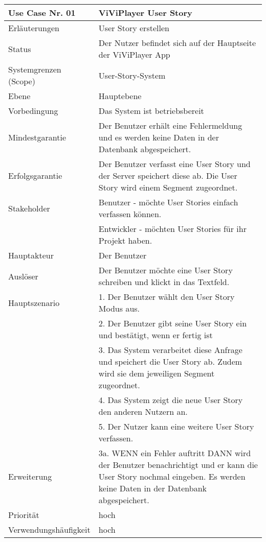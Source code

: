 \begin{tabularx}{\linewidth}{|l|X|}
	\hline
	Use Case Nr. 01			& \textbf{ViViPlayer User Story} \\ \hline
	Erläuterungen			&  User Story erstellen \\ \hline
	Status					&  Der Nutzer befindet sich auf der Hauptseite der ViViPlayer App \\ \hline
	Systemgrenzen (Scope)	&  User-Story-System\\ \hline
	Ebene					&  Hauptebene\\ \hline
	Vorbedingung			&  Das System ist betriebsbereit\\ \hline
	Mindestgarantie			&  Der Benutzer erhält eine Fehlermeldung und es werden keine Daten in der Datenbank abgespeichert.\\ \hline
	Erfolgsgarantie			&  Der Benutzer verfasst eine User Story und der Server speichert diese ab. Die User Story wird einem Segment zugeordnet.\\ \hline
	Stakeholder				&  Benutzer - möchte User Stories einfach verfassen können.\\ 
                            &   Entwickler - möchten User Stories für ihr Projekt haben. \\ \hline
	Hauptakteur				&  Der Benutzer\\ \hline
	Auslöser				&  Der Benutzer möchte eine User Story schreiben und klickt in das Textfeld. \\ \hline	
	Hauptszenario			&  1. Der Benutzer wählt den User Story Modus aus. \\
                            &  2. Der Benutzer gibt seine User Story ein und bestätigt, wenn er fertig ist\\
							&  3. Das System verarbeitet diese Anfrage und speichert die User Story ab. Zudem wird sie dem jeweiligen Segment zugeordnet. \\
							&  4. Das System zeigt die neue User Story den anderen Nutzern an.\\
							&  5. Der Nutzer kann eine weitere User Story verfassen. \\ \hline
	Erweiterung				& 3a. WENN ein Fehler auftritt DANN wird der Benutzer benachrichtigt und er kann die User Story nochmal eingeben. Es werden keine Daten in der Datenbank abgespeichert.\\ \hline
	Priorität				&  hoch \\ \hline
	Verwendungshäufigkeit	&  hoch \\ \hline
\end{tabularx}
